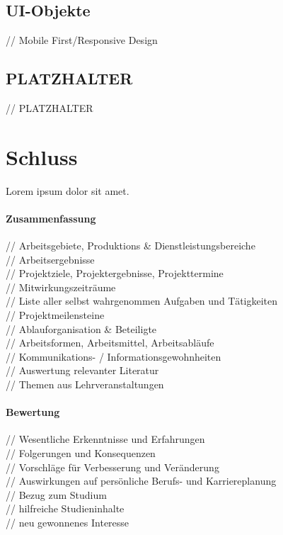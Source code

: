 \documentclass[12pt,a4paper,bibliography=totocnumbered,listof=totocnumbered]{scrartcl}
\begin{document}
\subsection{UI-Objekte}
// Mobile First/Responsive Design\\

\subsection{PLATZHALTER}
// PLATZHALTER\\
\pagebreak

\section{Schluss}
Lorem ipsum dolor sit amet.

\paragraph{Zusammenfassung}
// Arbeitsgebiete, Produktions \& Dienstleistungsbereiche\\
// Arbeitsergebnisse\\
// Projektziele, Projektergebnisse, Projekttermine\\
// Mitwirkungszeiträume\\
// Liste aller selbst wahrgenommen Aufgaben und Tätigkeiten\\
// Projektmeilensteine\\
// Ablauforganisation \& Beteiligte\\
// Arbeitsformen, Arbeitsmittel, Arbeitsabläufe\\
// Kommunikations- / Informationsgewohnheiten\\
// Auswertung relevanter Literatur\\
// Themen aus Lehrveranstaltungen\\

\paragraph{Bewertung}
// Wesentliche Erkenntnisse und Erfahrungen\\
// Folgerungen und Konsequenzen\\
// Vorschläge für Verbesserung und Veränderung\\
// Auswirkungen auf persönliche Berufs- und Karriereplanung\\
// Bezug zum Studium\\
// hilfreiche Studieninhalte\\
// neu gewonnenes Interesse\\
\pagebreak
\end{document}
